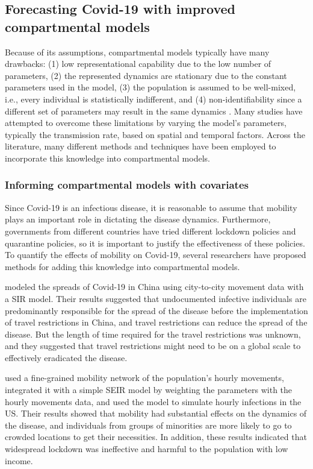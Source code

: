 \subsection{Forecasting Covid-19 with improved compartmental models}

Because of its assumptions, compartmental models typically have many drawbacks: (1) low representational capability due to the low number of parameters, (2) the represented dynamics are stationary due to the constant parameters used in the model, (3) the population is assumed to be well-mixed, i.e., every individual is statistically indifferent, and (4) non-identifiability since a different set of parameters may result in the same dynamics \cite{roosaAssessingParameterIdentifiability2019}.
Many studies have attempted to overcome these limitations by varying the model's parameters, typically the transmission rate, based on spatial and temporal factors.
Across the literature, many different methods and techniques have been employed to incorporate this knowledge into compartmental models.

\subsubsection{Informing compartmental models with covariates}

Since Covid-19 is an infectious disease, it is reasonable to assume that mobility plays an important role in dictating the disease dynamics.
Furthermore, governments from different countries have tried different lockdown policies and quarantine policies, so it is important to justify the effectiveness of these policies.
To quantify the effects of mobility on Covid-19, several researchers have proposed methods for adding this knowledge into compartmental models.

\citeauthor{liSubstantialUndocumentedInfection2020} \cite{liSubstantialUndocumentedInfection2020} modeled the spreads of Covid-19 in China using city-to-city movement data with a \gls{SIR} model.
Their results suggested that undocumented infective individuals are predominantly responsible for the spread of the disease before the implementation of travel restrictions in China, and travel restrictions can reduce the spread of the disease.
But the length of time required for the travel restrictions was unknown, and they suggested that travel restrictions might need to be on a global scale to effectively eradicated the disease.

\citeauthor{changMobilityNetworkModels2021} \cite{changMobilityNetworkModels2021} used a fine-grained mobility network of the population's hourly movements, integrated it with a simple \gls{SEIR} model by weighting the parameters with the hourly movements data, and used the model to simulate hourly infections in the US.
Their results showed that mobility had substantial effects on the dynamics of the disease, and individuals from groups of minorities are more likely to go to crowded locations to get their necessities.
In addition, these results indicated that widespread lockdown was ineffective and harmful to the population with low income.


